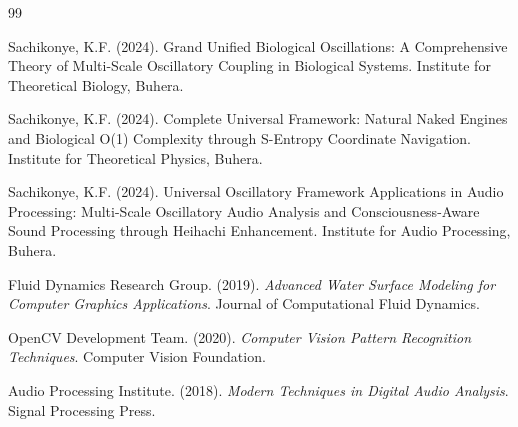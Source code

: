 \documentclass[12pt,a4paper]{article}
\begin{document}
\begin{thebibliography}{99}

Sachikonye, K.F. (2024). Grand Unified Biological Oscillations: A Comprehensive Theory of Multi-Scale Oscillatory Coupling in Biological Systems. Institute for Theoretical Biology, Buhera.

Sachikonye, K.F. (2024). Complete Universal Framework: Natural Naked Engines and Biological O(1) Complexity through S-Entropy Coordinate Navigation. Institute for Theoretical Physics, Buhera.

Sachikonye, K.F. (2024). Universal Oscillatory Framework Applications in Audio Processing: Multi-Scale Oscillatory Audio Analysis and Consciousness-Aware Sound Processing through Heihachi Enhancement. Institute for Audio Processing, Buhera.

Fluid Dynamics Research Group. (2019). \textit{Advanced Water Surface Modeling for Computer Graphics Applications}. Journal of Computational Fluid Dynamics.

OpenCV Development Team. (2020). \textit{Computer Vision Pattern Recognition Techniques}. Computer Vision Foundation.

Audio Processing Institute. (2018). \textit{Modern Techniques in Digital Audio Analysis}. Signal Processing Press.

\end{thebibliography}
\end{document}
